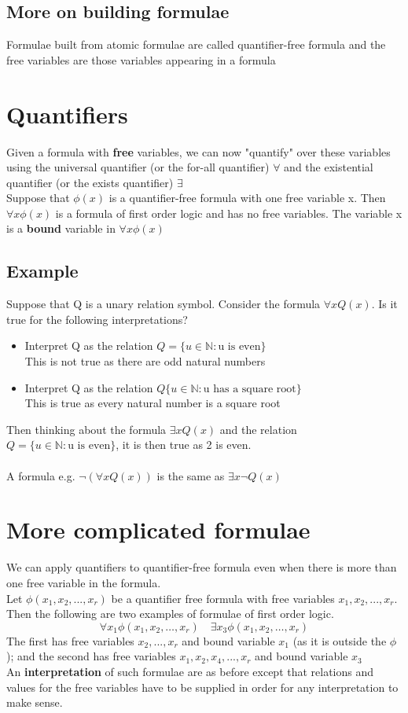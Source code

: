 \documentclass{article}[18pt]
\begin{document}
\subsection{More on building formulae}
Formulae  built from atomic formulae are called quantifier-free formula and the free variables are those variables appearing in a formula
\section{Quantifiers}
Given a formula with \textbf{free} variables, we can now "quantify" over these variables using the universal quantifier (or the for-all quantifier) $\forall$ and the existential quantifier (or the exists quantifier) $\exists$\\
Suppose that $\phi(x)$ is a quantifier-free formula with one free variable x. Then $\forall x \phi (x)$ is a formula of first order logic and has no free variables. The variable x is a \textbf{bound} variable in $\forall x \phi (x)$
\subsection{Example}
Suppose that Q is a unary relation symbol. Consider the formula $\forall x Q(x)$. Is it true for the following interpretations?
\begin{itemize}
	\item Interpret Q as the relation $Q=\{u \in \mathbb{ N }: \text{u is even}\}$\\
	This is not true as there are odd natural numbers
	\item Interpret Q as the relation $Q\{u\in \mathbb{ N }: \text{u has a square root}\}$\\
	This is true as every natural number is a square root
\end{itemize}
Then thinking about the formula $\exists x Q(x)$ and the relation $Q=\{u \in \mathbb{ N }: \text{u is even}\}$, it is then true as 2 is even.\\
\\
A formula e.g. $\lnot(\forall x Q(x))$ is the same as $\exists x \lnot Q(x)$ 
\section{More complicated formulae}
We can apply quantifiers to quantifier-free formula even when there is more than one free variable in the formula.\\
Let $\phi(x_1,x_2,...,x_r)$ be a quantifier free formula with free variables $x_1,x_2,...,x_r$. Then the following are two examples of formulae of first order logic.
$$\forall x _ { 1 } \phi \left( x _ { 1 } , x _ { 2 } , \ldots , x _ { r } \right) \quad \exists x _ { 3 } \phi \left( x _ { 1 } , x _ { 2 } , \ldots , x _ { r } \right)$$
The first has free variables $x_2,...,x_r$ and bound variable $x_1$ (as it is outside the $\phi$); and the second has free variables $x_1,x_2,x_4,...,x_r$ and bound variable $x_3$\\
An \textbf{interpretation} of such formulae are as before except that relations and values for the free variables have to be supplied in order for any interpretation to make sense.
\end{document}
